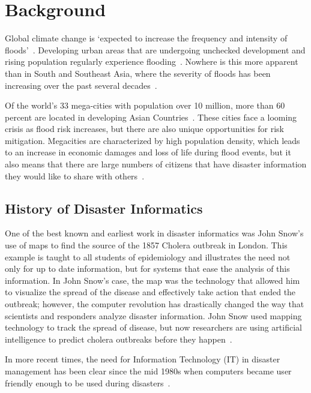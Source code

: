 \chapter{Background}

Global climate change is `expected to increase the frequency and intensity of
floods'~\cite{ahernGlobalHealthImpacts2005}. Developing urban areas that are
undergoing unchecked development and rising population regularly experience
flooding~\cite{chanFloodRiskAsia2012}.  Nowhere is this more apparent than
in South and Southeast Asia, where the severity of floods has been increasing
over the past several decades~\cite{tortiFloodsSoutheastAsia2012}.

Of the world's 33 mega-cities with population over 10 million, more than 60
percent are located in developing Asian
Countries~\cite{unitednationsdepartmentofeconomicandsocialaffairsWorldCities20162016}.
These cities face a looming crisis as flood risk increases, but there are also
unique opportunities for risk mitigation. Megacities are characterized by high
population density, which leads to an increase in economic damages and loss of
life during flood events, but it also means that there are large numbers of
citizens that have disaster information they would like to share with
others~\cite{chanFloodRiskAsia2012}.

\section{History of Disaster Informatics} One of the best known and earliest
work in disaster informatics was John Snow's use of maps to find the source of
the 1857 Cholera outbreak in London\cite{rogersJohnSnowData2013}. This example
is taught to all students of epidemiology and illustrates the need
not only for up to date information, but for systems that ease the
analysis of this information. In John Snow's case, the map was the technology
that allowed him to visualize the spread of the disease and effectively take
action that ended the outbreak; however, the computer revolution has drastically
changed the way that scientists and responders analyze disaster information.
John Snow used mapping technology to track the spread of disease, but now
researchers are using artificial intelligence to predict cholera outbreaks
before they happen~\cite{radinskyMiningWebPredict2013}.

In more recent times, the need for Information Technology (IT) in disaster
management has been clear since the mid 1980s when computers became user
friendly enough to be used during
disasters~\cite{universityTerminalDisastersComputer1986}.

